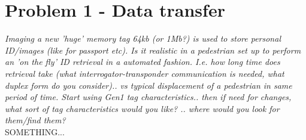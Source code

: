 \section{Problem 1 - Data transfer}
\textit{Imaging a new 'huge' memory tag 64kb (or 1Mb?) is used to store personal ID/images (like for passport etc). Is it realistic in a pedestrian set up to perform an 'on the fly' ID retrieval in a automated fashion. I.e. how long time does retrieval take (what interrogator-transponder communication is needed, what duplex form do you consider).. vs typical displacement of a pedestrian in same period of time. Start using Gen1 tag characteristics.. then if need for changes, what sort of tag characteristics would you like? .. where would you look for them/find them?}\\

SOMETHING...


